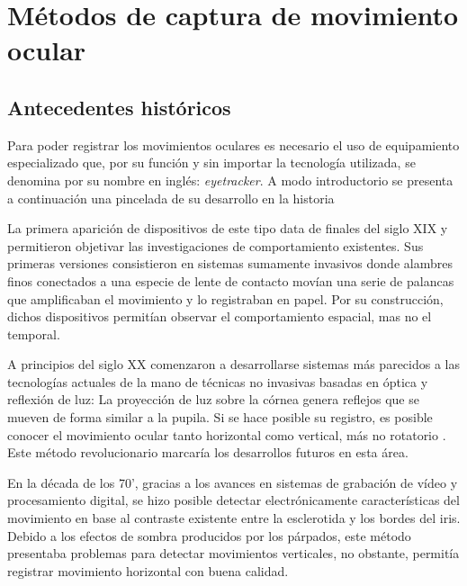\documentclass[../Main.tex]{subfiles}
\begin{document}
	\section{Métodos de captura de movimiento ocular}
	\label{sub:02_metodos_de_captura}
		\subsection{Antecedentes históricos} 
		\label{sub:02_antecedentes_historicos}
			Para poder registrar los movimientos oculares es necesario el uso de equipamiento especializado que, por su función y sin importar la tecnología utilizada, se denomina por su nombre en inglés: \textit{\gls{eyetracker}}. A modo introductorio se presenta a continuación una pincelada de su desarrollo en la historia \cite{article:eyetracker_eggert, article:eyetracker_richardson}

			La primera aparición de dispositivos de este tipo data de finales del siglo XIX \cite{article:eyetracker_hist1, article:eyetracker_hist2} y permitieron objetivar las investigaciones de comportamiento existentes. Sus primeras versiones consistieron en sistemas sumamente invasivos donde alambres finos conectados a una especie de lente de contacto movían una serie de palancas que amplificaban el movimiento y lo registraban en papel. Por su construcción, dichos dispositivos permitían observar el comportamiento espacial, mas no el temporal. 

			A principios del siglo XX comenzaron a desarrollarse sistemas más parecidos a las tecnologías actuales de la mano de técnicas no invasivas basadas en óptica y reflexión de luz: La proyección de luz sobre la córnea genera reflejos que se mueven de forma similar a la pupila. Si se hace posible su registro, es posible conocer el movimiento ocular tanto horizontal como vertical, más no rotatorio \cite{article:eyetracker_hist3}. Este método revolucionario marcaría los desarrollos futuros en esta área.

			En la década de los 70', gracias a los avances en sistemas de grabación de vídeo y procesamiento digital, se hizo posible detectar electrónicamente características del movimiento en base al contraste existente entre la \gls{esclerotida} y los bordes del iris. Debido a los efectos de sombra producidos por los párpados, este método presentaba problemas para detectar movimientos verticales, no obstante, permitía registrar movimiento horizontal con buena calidad. 
\end{document}
